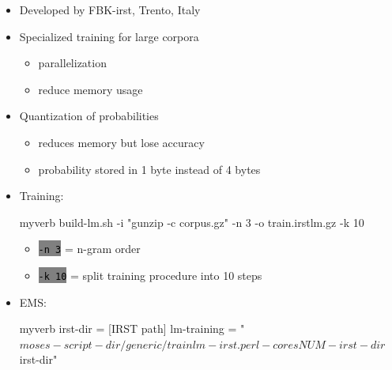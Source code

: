 \documentclass[landscape]{uedslides2C}
\newcommand{\littlecode}[1]{\colorbox{gray}{\textcolor{black}{\small \tt #1}}}
\begin{document}
\vspace{10mm}
\begin{itemize}

\item Developed by FBK-irst, Trento, Italy

\item Specialized training for large corpora
	\begin{itemize}
	\item parallelization
	\item reduce memory usage
	\end{itemize}

\item Quantization of probabilities
	\begin{itemize}
	\item reduces memory but lose accuracy
	\item probability stored in 1 byte instead of 4 bytes
	\end{itemize}
\end{itemize}


\begin{itemize}

\item Training: \\
\begin{SaveVerbatim}{myverb} 
build-lm.sh -i "gunzip -c corpus.gz" -n 3 
      -o train.irstlm.gz -k 10
\end{SaveVerbatim}
\colorbox{gray}{}

\begin{itemize}
\item \littlecode{-n 3} = n-gram order
\item \littlecode{-k 10} = split training procedure into 10 steps
\end{itemize}

\item EMS:  \\
  \begin{SaveVerbatim}{myverb} 
  irst-dir = [IRST path]
  lm-training = "$moses-script-dir/generic/trainlm-irst.perl 
		  -cores NUM -irst-dir $irst-dir"
  \end{SaveVerbatim}
  \colorbox{gray}{}

\end{itemize}
\end{document}
